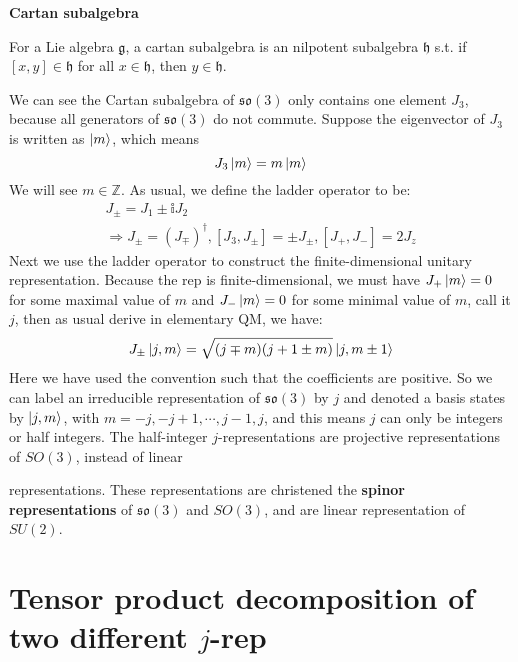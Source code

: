 \documentclass{article}
\begin{document}
	
	\begin{definition}
		\textbf{Cartan subalgebra}
		
		For a Lie algebra $\mathfrak{g}$, a cartan subalgebra is an nilpotent subalgebra $\mathfrak{h}$ s.t. if $[ x,y] \in \mathfrak{h}$ for all $x\in \mathfrak{h}$, then $y\in \mathfrak{h}$. \ 
	\end{definition}
	We can see the Cartan subalgebra of $\mathfrak{so}( 3)$ only contains one element $J_{3}$, because all generators of $\mathfrak{so}( 3)$ do not commute. Suppose the eigenvector of $J_{3}$ is written as $\ket{m}$, which means
	\begin{equation*}
		J_{3}\ket{m} =m\ket{m}
	\end{equation*}
	We will see $m\in \mathbb{Z}$. As usual, we define the ladder operator to be:
	\begin{gather*}
		J_{\pm } =J_{1} \pm \mathbb{i} J_{2}\\
		\Rightarrow J_{\pm } =( J_{\mp })^{\dagger } ,[ J_{3} ,J_{\pm }] =\pm J_{\pm } ,[ J_{+} ,J_{-}] =2J_{z}
	\end{gather*}
	Next we use the ladder operator to construct the finite-dimensional unitary representation. Because the rep is finite-dimensional, we must have $J_{+}\ket{m} =0$ for some maximal value of $m$ and $J_{-}\ket{m} =0$ for some minimal value of $m$, call it $j$, then as usual derive in elementary QM, we have:
	\begin{equation*}
		J_{\pm }\ket{j,m} =\sqrt{( j\mp m)( j+1\pm m)}\ket{j,m\pm 1}
	\end{equation*}
	Here we have used the convention such that the coefficients are positive. So we can label an irreducible representation of $\mathfrak{so}( 3)$ by $j$ and denoted a basis states by $\ket{j,m}$, with $m=−j,−j+1,\cdots ,j−1,j$, and this means $j$ can only be integers or half integers. The half-integer $j$-representations are projective representations of $SO( 3)$, instead of linear
	
	representations. These representations are christened the \textbf{spinor representations} of $\mathfrak{so}( 3)$ and $SO( 3)$, and are linear representation of $SU( 2)$. 
	
	
	\section{Tensor product decomposition of two different $j$-rep}
	
\end{document}
